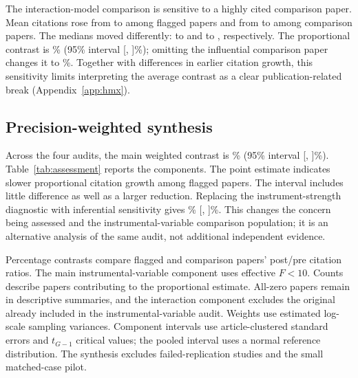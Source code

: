 \documentclass[11pt,letterpaper]{article}
\begin{document}
The interaction-model comparison is sensitive to a highly cited comparison paper. Mean citations rose from \HmxFlaggedMeanBefore{} to \HmxFlaggedMeanAfter{} among flagged papers and from \HmxComparisonMeanBefore{} to \HmxComparisonMeanAfter{} among comparison papers. The medians moved differently: \HmxFlaggedMedianBefore{} to \HmxFlaggedMedianAfter{} and \HmxComparisonMedianBefore{} to \HmxComparisonMedianAfter{}, respectively. The proportional contrast is \HmxPercent\% (95\% interval [\HmxLower, \HmxUpper]\%); omitting the influential comparison paper changes it to \HmxLooMax\%. Together with differences in earlier citation growth, this sensitivity limits interpreting the average contrast as a clear publication-related break (Appendix~\ref{app:hmx}).

\subsection{Precision-weighted synthesis}
Across the four audits, the main weighted contrast is \AuditWeakPercent\% (95\% interval [\AuditWeakLower, \AuditWeakUpper]\%). Table~\ref{tab:assessment} reports the components. The point estimate indicates slower proportional citation growth among flagged papers. The interval includes little difference as well as a larger reduction. Replacing the instrument-strength diagnostic with inferential sensitivity gives \AuditSensitivePercent\% [\AuditSensitiveLower, \AuditSensitiveUpper]\%. This changes the concern being assessed and the instrumental-variable comparison population; it is an alternative analysis of the same audit, not additional independent evidence.

\begin{table}[htbp]
\centering
\caption{Relative citation growth across four methodological audits}
\label{tab:assessment}
\small

\par\smallskip
\begin{minipage}{\linewidth}\footnotesize
Percentage contrasts compare flagged and comparison papers' post/pre citation ratios. The main instrumental-variable component uses effective $F<10$. Counts describe papers contributing to the proportional estimate. All-zero papers remain in descriptive summaries, and the interaction component excludes the original already included in the instrumental-variable audit. Weights use estimated log-scale sampling variances. Component intervals use article-clustered standard errors and $t_{G-1}$ critical values; the pooled interval uses a normal reference distribution. The synthesis excludes failed-replication studies and the small matched-case pilot.
\end{minipage}
\end{table}
\end{document}
